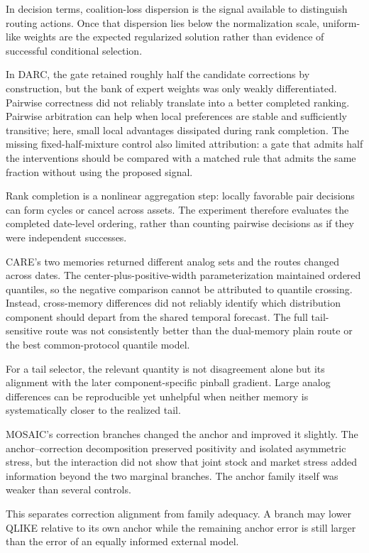 \documentclass{crebss}
\begin{document}
In decision terms, coalition-loss dispersion is the signal available to distinguish routing actions. Once that dispersion lies below the normalization scale, uniform-like weights are the expected regularized solution rather than evidence of successful conditional selection.

In DARC, the gate retained roughly half the candidate corrections by construction, but the bank of expert weights was only weakly differentiated. Pairwise correctness did not reliably translate into a better completed ranking. Pairwise arbitration can help when local preferences are stable and sufficiently transitive; here, small local advantages dissipated during rank completion. The missing fixed-half-mixture control also limited attribution: a gate that admits half the interventions should be compared with a matched rule that admits the same fraction without using the proposed signal.

Rank completion is a nonlinear aggregation step: locally favorable pair decisions can form cycles or cancel across assets. The experiment therefore evaluates the completed date-level ordering, rather than counting pairwise decisions as if they were independent successes.

CARE's two memories returned different analog sets and the routes changed across dates. The center-plus-positive-width parameterization maintained ordered quantiles, so the negative comparison cannot be attributed to quantile crossing. Instead, cross-memory differences did not reliably identify which distribution component should depart from the shared temporal forecast. The full tail-sensitive route was not consistently better than the dual-memory plain route or the best common-protocol quantile model.

For a tail selector, the relevant quantity is not disagreement alone but its alignment with the later component-specific pinball gradient. Large analog differences can be reproducible yet unhelpful when neither memory is systematically closer to the realized tail.

MOSAIC's correction branches changed the anchor and improved it slightly. The anchor--correction decomposition preserved positivity and isolated asymmetric stress, but the interaction did not show that joint stock and market stress added information beyond the two marginal branches. The anchor family itself was weaker than several controls.

This separates correction alignment from family adequacy. A branch may lower QLIKE relative to its own anchor while the remaining anchor error is still larger than the error of an equally informed external model.
\end{document}
